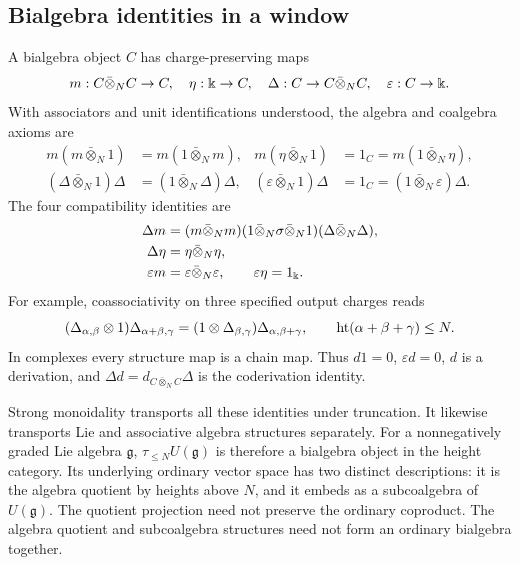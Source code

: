 \subsection{Bialgebra identities in a window}

A bialgebra object $C$ has charge-preserving maps
\[
 m:C\bar\otimes_N C\to C,\quad \eta:\Bbbk\to C,\quad
 \Delta:C\to C\bar\otimes_N C,\quad \varepsilon:C\to\Bbbk.
\]
With associators and unit identifications understood, the algebra and
coalgebra axioms are
\begin{align*}
 m(m\bar\otimes_N1)&=m(1\bar\otimes_N m),&
 m(\eta\bar\otimes_N1)&=1_C=m(1\bar\otimes_N\eta),\\
 (\Delta\bar\otimes_N1)\Delta&=(1\bar\otimes_N\Delta)\Delta,&
 (\varepsilon\bar\otimes_N1)\Delta&=1_C
   =(1\bar\otimes_N\varepsilon)\Delta.
\end{align*}
The four compatibility identities are
\begin{align}
 \Delta m&=(m\bar\otimes_N m)
 (1\bar\otimes_N\sigma\bar\otimes_N1)
 (\Delta\bar\otimes_N\Delta),\label{bialgebra-identities}\\
 \Delta\eta&=\eta\bar\otimes_N\eta,\notag\\
 \varepsilon m&=\varepsilon\bar\otimes_N\varepsilon,
 \qquad \varepsilon\eta=1_\Bbbk.\notag
\end{align}
For example, coassociativity on three specified output charges reads
\[
 (\Delta_{\alpha,\beta}\otimes1)\Delta_{\alpha+\beta,\gamma}
 =(1\otimes\Delta_{\beta,\gamma})\Delta_{\alpha,\beta+\gamma},
 \qquad \operatorname{ht}(\alpha+\beta+\gamma)\leq N.
\]
In complexes every structure map is a chain map.  Thus $d1=0$,
$\varepsilon d=0$, $d$ is a derivation, and
$\Delta d=d_{C\bar\otimes_N C}\Delta$ is the coderivation identity.

Strong monoidality transports all these identities under truncation.
It likewise transports Lie and associative algebra structures separately.
For a nonnegatively graded Lie algebra $\mathfrak g$,
$\tau_{\leq N}U(\mathfrak g)$ is therefore a bialgebra object in the
height category.  Its underlying ordinary vector space has two distinct
descriptions: it is the algebra quotient by heights above $N$, and it
embeds as a subcoalgebra of $U(\mathfrak g)$.
The quotient projection need not preserve the ordinary coproduct.
The algebra quotient and subcoalgebra structures need not form an
ordinary bialgebra together.

